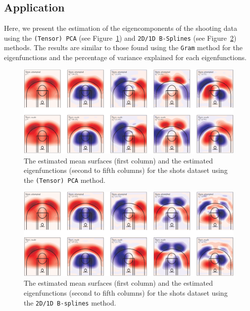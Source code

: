 
\subsection{Application} %
\label{sub:application}

Here, we present the estimation of the eigencomponents of the shooting data using the \texttt{(Tensor) PCA} (see Figure~\ref{fig:eigenfunctions_fcptpa}) and \texttt{2D/1D B-Splines} (see Figure~\ref{fig:eigenfunctions_psplines}) methods. The results are similar to those found using the \texttt{Gram} method for the eigenfunctions and the percentage of variance explained for each eigenfunctions.

\begin{figure}
    \centering
    \includegraphics[width=\textwidth]{figures/eigenfunctions_fcptpa}
    \caption{The estimated mean surfaces (first column) and the estimated eigenfunctions (second to fifth columns) for the shots dataset using the \texttt{(Tensor) PCA} method.}
    \label{fig:eigenfunctions_fcptpa}
\end{figure}

\begin{figure}
    \centering
    \includegraphics[width=\textwidth]{figures/eigenfunctions_psplines}
    \caption{The estimated mean surfaces (first column) and the estimated eigenfunctions (second to fifth columns) for the shots dataset using the \texttt{2D/1D B-splines} method.}
    \label{fig:eigenfunctions_psplines}
\end{figure}


